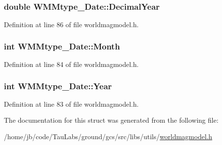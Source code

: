 \hypertarget{struct_w_m_mtype___date_a66b662f919345a2e81889ef080947ec1}{
\subsubsection[{\-Decimal\-Year}]{\setlength{\rightskip}{0pt plus 5cm}double {\bf \-W\-M\-Mtype\-\_\-\-Date\-::\-Decimal\-Year}}}\label{struct_w_m_mtype___date_a66b662f919345a2e81889ef080947ec1}


\-Definition at line 86 of file worldmagmodel.\-h.

\hypertarget{struct_w_m_mtype___date_a8c47663c3abf7deaf85b9f7630d51738}{
\subsubsection[{\-Month}]{\setlength{\rightskip}{0pt plus 5cm}int {\bf \-W\-M\-Mtype\-\_\-\-Date\-::\-Month}}}\label{struct_w_m_mtype___date_a8c47663c3abf7deaf85b9f7630d51738}


\-Definition at line 84 of file worldmagmodel.\-h.

\hypertarget{struct_w_m_mtype___date_a6a93268d51911bf52e36f3096b1c263f}{
\subsubsection[{\-Year}]{\setlength{\rightskip}{0pt plus 5cm}int {\bf \-W\-M\-Mtype\-\_\-\-Date\-::\-Year}}}\label{struct_w_m_mtype___date_a6a93268d51911bf52e36f3096b1c263f}


\-Definition at line 83 of file worldmagmodel.\-h.



\-The documentation for this struct was generated from the following file\-:\begin{DoxyCompactItemize}
\item 
/home/jb/code/\-Tau\-Labs/ground/gcs/src/libs/utils/\hyperlink{worldmagmodel_8h}{worldmagmodel.\-h}\end{DoxyCompactItemize}
